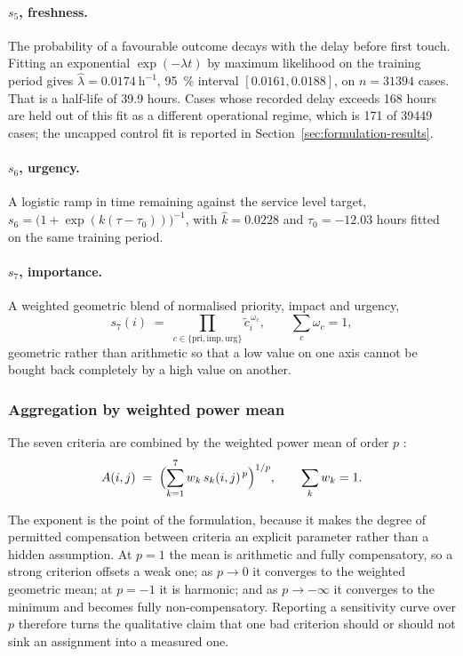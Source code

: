 \paragraph{$s_5$, freshness.} The probability of a favourable outcome decays with the delay
before first touch. Fitting an exponential $\exp(-\lambda t)$ by maximum likelihood on the
training period gives
$\hat{\lambda} = \num{0.0174}\ \text{h}^{-1}$, \SI{95}{\percent} interval
$[\num{0.0161}, \num{0.0188}]$, on $n = \num{31394}$ cases. That is a half-life of
\num{39.9} hours. Cases whose recorded delay exceeds \num{168} hours are held out of this
fit as a different operational regime, which is \num{171} of \num{39449} cases; the uncapped
control fit is reported in Section~\ref{sec:formulation-results}.

\paragraph{$s_6$, urgency.} A logistic ramp in time remaining against the service level target,
$s_6 = \bigl(1 + \exp(k(\tau - \tau_0))\bigr)^{-1}$, with $\hat{k} = \num{0.0228}$ and
$\hat{\tau}_0 = \num{-12.03}$ hours fitted on the same training period.

\paragraph{$s_7$, importance.} A weighted geometric blend of normalised priority, impact and
urgency,
\begin{equation}
s_7(i) \;=\; \prod_{c \in \{\text{pri},\text{imp},\text{urg}\}} \tilde{c}_i^{\,\omega_c},
\qquad \sum_c \omega_c = 1 ,
\label{eq:importance}
\end{equation}
geometric rather than arithmetic so that a low value on one axis cannot be bought back
completely by a high value on another.

\subsubsection{Aggregation by weighted power mean}

The seven criteria are combined by the weighted power mean of order $p$
\citep{dyckhoff1984generalized,dujmovic2015weighted}:
\begin{equation}
A(i,j) \;=\; \Bigl( \sum_{k=1}^{7} w_k \, s_k(i,j)^{\,p} \Bigr)^{1/p},
\qquad \sum_k w_k = 1 .
\label{eq:powermean}
\end{equation}

The exponent is the point of the formulation, because it makes the degree of permitted
compensation between criteria an explicit parameter rather than a hidden assumption. At $p=1$
the mean is arithmetic and fully compensatory, so a strong criterion offsets a weak one; as
$p \to 0$ it converges to the weighted geometric mean; at $p=-1$ it is harmonic; and as
$p \to -\infty$ it converges to the minimum and becomes fully non-compensatory. Reporting a
sensitivity curve over $p$ therefore turns the qualitative claim that one bad criterion should
or should not sink an assignment into a measured one.

